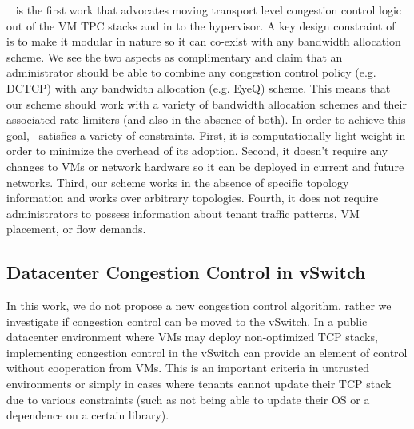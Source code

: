 ~\acdc{} is the first work that advocates moving transport level congestion control logic
out of the VM TPC stacks and in to the hypervisor. A key design constraint of~\acdc{} is 
to make it modular in nature so it can co-exist with any bandwidth allocation scheme. 
We see the two aspects as complimentary and claim that an administrator should be able to
combine any congestion control policy (e.g. DCTCP) with any bandwidth allocation (e.g. 
EyeQ) scheme. This means that our scheme should work with a variety of bandwidth 
allocation schemes and their associated rate-limiters (and also in the absence of both). 
In order to achieve this goal,~\acdc{} satisfies a variety of constraints. First, it is 
computationally light-weight in order to minimize the overhead of its adoption. Second, 
it doesn't require any changes to VMs or network hardware so it can be deployed in 
current and future networks. Third, our scheme works in the absence of specific topology 
information and works over arbitrary topologies. Fourth, it does not require 
administrators to possess information about tenant traffic patterns, VM placement, or 
flow demands.


\subsection{Datacenter Congestion Control in vSwitch}
In this work, we do not propose a new congestion control algorithm, rather we investigate
if congestion control can be moved to the vSwitch. In a public datacenter environment 
where VMs may deploy non-optimized TCP stacks, implementing congestion control in the 
vSwitch can provide an element of control without cooperation from VMs. This is an 
important criteria in untrusted environments or simply in cases where tenants cannot 
update their TCP stack due to various constraints (such as not being able to update their
OS or a dependence on a certain library). 

